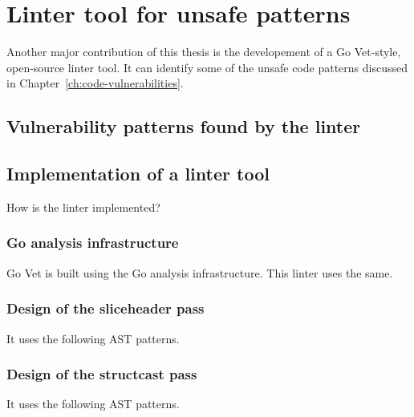 
\chapter{Linter tool for unsafe patterns}\label{ch:go-safer}

Another major contribution of this thesis is the developement of a Go Vet-style, open-source linter tool. It can
identify some of the unsafe code patterns discussed in Chapter~\ref{ch:code-vulnerabilities}.



\section{Vulnerability patterns found by the linter}\label{sec:go-safer-scope}



\section{Implementation of a linter tool}\label{sec:go-safer-implementation}

How is the linter implemented?


\subsection{Go analysis infrastructure}\label{subsec:go-safer-analysis-infrastucture}

Go Vet is built using the Go analysis infrastructure. This linter uses the same.


\subsection{Design of the sliceheader pass}\label{subsec:go-safer-passes-sliceheader}

It uses the following AST patterns.


\subsection{Design of the structcast pass}\label{subsec:go-safer-passes-structcast}

It uses the following AST patterns.


